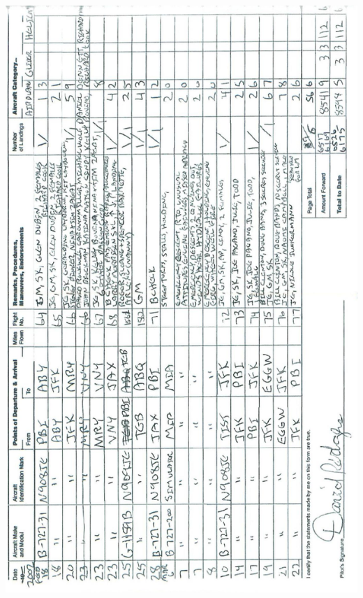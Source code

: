\documentclass[10pt]{article}
\begin{document}
\includegraphics[max width=\textwidth, center]{2025_02_27_dd68c3d38de88f0516d9g-095}
\end{document}
